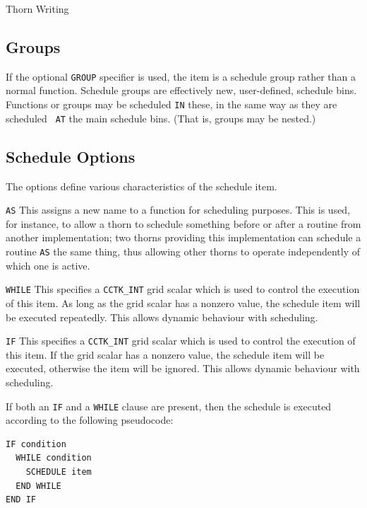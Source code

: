 \begin{cactuspart}{Thorn Writing}

\subsection{Groups}
\label{scheduling:groups}

If the optional \texttt{GROUP} specifier is used, the item is a schedule
group rather than a normal function.  Schedule groups are effectively
new, user-defined, schedule bins.  Functions or groups may be
scheduled \texttt{IN} these, in the same way as they are scheduled {\tt
AT} the main schedule bins.  (That is, groups may be nested.)


\subsection{Schedule Options}
\label{scheduling:schedule_options}
The options define various characteristics of the schedule item.

\begin{Lentry}
\item[\texttt{AS}]
This assigns a new name to a function for scheduling purposes.  This
is used, for instance, to allow a thorn to schedule something before
or after a routine from another implementation;  two thorns providing this
implementation can schedule a routine \texttt{AS} the same thing, thus
allowing other thorns to operate independently of which one is active.

\item[\texttt{WHILE}]
This specifies a \texttt{CCTK\_INT} grid scalar which is used to
control the execution of this item.  As long as the grid scalar has
a nonzero value, the schedule item will be executed repeatedly.  This
allows dynamic behaviour with scheduling.

\item[\texttt{IF}]
This specifies a \texttt{CCTK\_INT} grid scalar which is used to
control the execution of this item.  If the grid scalar has a
nonzero value, the schedule item will be executed, otherwise the item
will be ignored.  This allows dynamic behaviour with scheduling.

If both an \texttt{IF} and a \texttt{WHILE} clause are present, then
the schedule is executed according to the following pseudocode:
\begin{verbatim}
IF condition
  WHILE condition
    SCHEDULE item
  END WHILE
END IF
\end{verbatim}


\end{Lentry}
\end{cactuspart}
